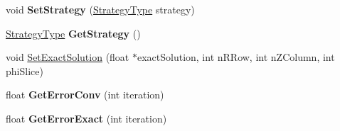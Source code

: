 \begin{DoxyCompactItemize}
\item 
\hypertarget{classPoissonSolver3DCylindricalGPU_adedaba4fea9617006fd48791e2c50d90}{}\label{classPoissonSolver3DCylindricalGPU_adedaba4fea9617006fd48791e2c50d90} 
void {\bfseries Set\+Strategy} (\hyperlink{classPoissonSolver3DCylindricalGPU_a5358c19436c2d27d2b917d070273e180}{Strategy\+Type} strategy)
\item 
\hypertarget{classPoissonSolver3DCylindricalGPU_a9156fb9e54827b78ba8dfbc85ca449b3}{}\label{classPoissonSolver3DCylindricalGPU_a9156fb9e54827b78ba8dfbc85ca449b3} 
\hyperlink{classPoissonSolver3DCylindricalGPU_a5358c19436c2d27d2b917d070273e180}{Strategy\+Type} {\bfseries Get\+Strategy} ()
\item 
void \hyperlink{classPoissonSolver3DCylindricalGPU_af269b7d4472ee9681f9d372373f1e7f8}{Set\+Exact\+Solution} (float $\ast$exact\+Solution, int n\+R\+Row, int n\+Z\+Column, int phi\+Slice)
\item 
\hypertarget{classPoissonSolver3DCylindricalGPU_a926050142aa1870d8901e59f0bd80599}{}\label{classPoissonSolver3DCylindricalGPU_a926050142aa1870d8901e59f0bd80599} 
float {\bfseries Get\+Error\+Conv} (int iteration)
\item 
\hypertarget{classPoissonSolver3DCylindricalGPU_a1f873b485195b892f7d6e7095ead417e}{}\label{classPoissonSolver3DCylindricalGPU_a1f873b485195b892f7d6e7095ead417e} 
float {\bfseries Get\+Error\+Exact} (int iteration)
\end{DoxyCompactItemize}
